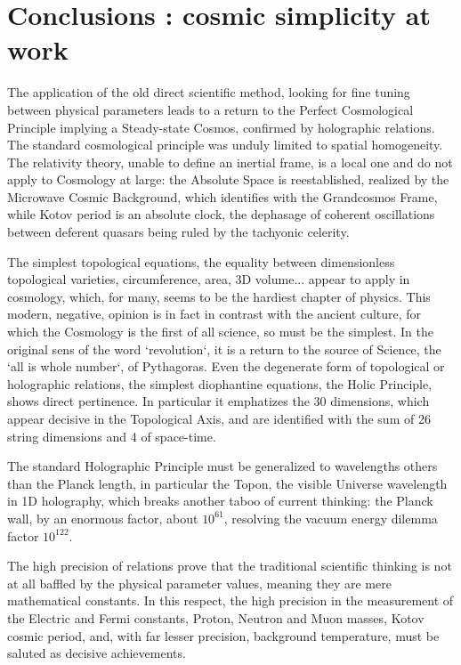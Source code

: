 \documentclass[twoside,draft]{article}
\begin{document}
\begin{sloppypar}
{\section {Conclusions : cosmic simplicity at work}

The application of the old direct scientific method, looking for fine tuning between physical
parameters leads to a return to the Perfect Cosmological Principle implying a Steady-state Cosmos,
confirmed by holographic relations. The standard cosmological principle was unduly limited to
spatial homogeneity. The relativity theory, unable to define an inertial frame, is a local one and do
not apply to Cosmology at large: the Absolute Space is reestablished, realized by the Microwave
Cosmic Background, which identifies with the Grandcosmos Frame, while Kotov period is an
absolute clock, the dephasage of coherent oscillations between deferent quasars being ruled by the tachyonic celerity.

The simplest topological equations, the equality between dimensionless topological varieties,
circumference, area, 3D volume... appear to apply in cosmology, which, for many, seems to be the hardiest
chapter of physics. This modern, negative, opinion is in fact in contrast with the ancient culture, for
which the Cosmology is the first of all science, so must be the simplest. In the original sens of the
word `revolution`, it is a return to the source of Science, the `all is whole number`, of Pythagoras.
Even the degenerate form of topological or holographic relations, the simplest diophantine
equations, the Holic Principle, shows direct pertinence. In particular it emphatizes the 30
dimensions, which appear decisive in the Topological Axis, and are identified with the sum of 26 string
dimensions and 4 of space-time.

The standard Holographic Principle must be generalized to wavelengths others than the Planck
length, in particular the Topon, the visible Universe wavelength in 1D holography, which breaks
another taboo of current thinking: the Planck wall, by an enormous factor, about $10^{61}$, resolving the
vacuum energy dilemma factor $10^{122}$.

The high precision of relations prove that the traditional scientific thinking is not at all baffled by
the physical parameter values, meaning they are mere mathematical constants. In this respect, the
high precision in the measurement of the Electric and Fermi constants, Proton, Neutron and Muon masses, Kotov cosmic period, and, with far lesser precision, background temperature, must be saluted as decisive achievements.

}
\end{sloppypar}
\end{document}
